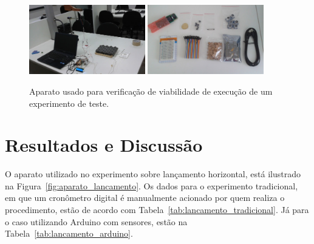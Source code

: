 \documentclass[article,11pt,a4paper]{abntex2}
\begin{document}
\begin{figure}[!hbt]
\centering
\includegraphics[width=0.45\textwidth]{figs/computador1.jpg}\hspace{5mm}
\includegraphics[width=0.45\textwidth]{figs/materiais1.jpg}
\caption{Aparato usado  para verificação de viabilidade de execução de um experimento de teste.}
\label{fig:aparato_computador}
\end{figure}










\section{Resultados e Discussão}


O aparato utilizado no experimento sobre lançamento horizontal, está ilustrado na Figura~\ref{fig:aparato_lancamento}.
Os dados para o experimento tradicional, em que um cronômetro digital é manualmente acionado por quem realiza o procedimento, estão de acordo com Tabela~\ref{tab:lancamento_tradicional}.
Já para o caso utilizando Arduino com sensores, estão na Tabela~\ref{tab:lancamento_arduino}.
\end{document}
